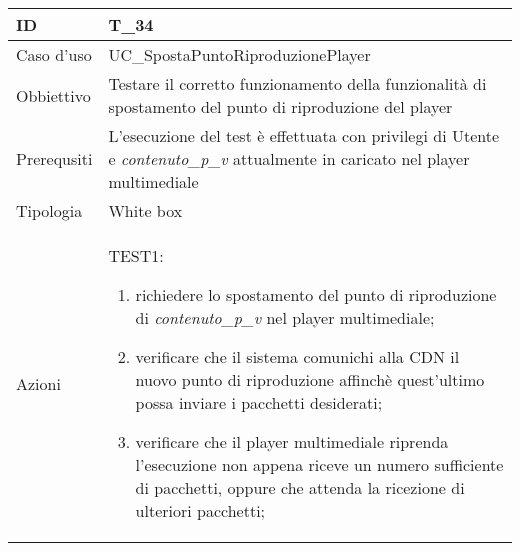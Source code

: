 \begin{table}[hb]
    \centering
    \begin{tabular}{ |p{2cm}|p{10cm}|  }
        \hline
        ID          & T\_34                                                                                                                               \\\hline
        Caso d'uso  & UC\_SpostaPuntoRiproduzionePlayer                                                                                                   \\\hline
        Obbiettivo  & Testare il corretto funzionamento della funzionalità di spostamento del punto di riproduzione del player                            \\\hline
        Prerequsiti & L'esecuzione del test è effettuata con privilegi di Utente e \emph{contenuto\_p\_v} attualmente in caricato nel player multimediale \\\hline
        Tipologia   & White box                                                                                                                           \\\hline
        Azioni      &
        TEST1:
        \begin{enumerate}[nosep, topsep=0pt]
            \item richiedere lo spostamento del punto di riproduzione di \emph{contenuto\_p\_v} nel player multimediale;
            \item verificare che il sistema comunichi alla CDN il nuovo punto di riproduzione affinchè quest'ultimo possa inviare i pacchetti desiderati;
            \item verificare che il player multimediale riprenda l'esecuzione non appena riceve un numero sufficiente di pacchetti, oppure che attenda la ricezione di ulteriori pacchetti;
        \end{enumerate}
        \\\hline
    \end{tabular}
\end{table}

